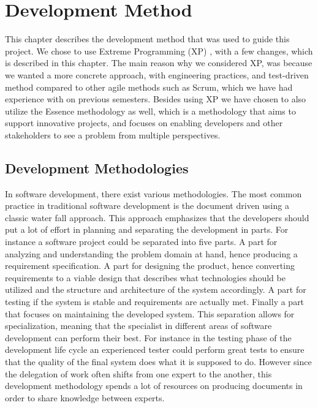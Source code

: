 
\chapter{Development Method}
\label{cha:development_method}

This chapter describes the development method that was used to guide this project. We chose to use Extreme Programming (XP) \parencite{xp}, with a few changes, which is described in this chapter. The main reason why we considered XP, was because we wanted a more concrete approach, with engineering practices, and test-driven method compared to other agile methods such as Scrum, which we have had experience with on previous semesters. Besides using XP we have chosen to also utilize the Essence methodology as well, which is a methodology that aims to support innovative projects, and focuses on enabling developers and other stakeholders to see a problem from multiple perspectives. 

\section{Development Methodologies}
\label{sec:development_methodologies}

In software development, there exist various methodologies. The most common practice in traditional software development is the document driven using a classic water fall approach. This approach emphasizes that the developers should put a lot of effort in planning and separating the development in parts. For instance a software project could be separated into five parts. A part for analyzing and understanding the problem domain at hand, hence producing a requirement specification. A part for designing the product, hence converting requirements to a viable design that describes what technologies should be utilized and the structure and architecture of the system accordingly. A part for testing if the system is stable and requirements are actually met. Finally a part that focuses on maintaining the developed system. This separation allows for specialization, meaning that the specialist in different areas of software development can perform their best. For instance in the testing phase of the development life cycle an experienced tester could perform great tests to ensure that the quality of the final system does what it is supposed to do. However since the delegation of work often shifts from one expert to the another, this development methodology spends a lot of resources on producing documents in order to share knowledge between experts. 






